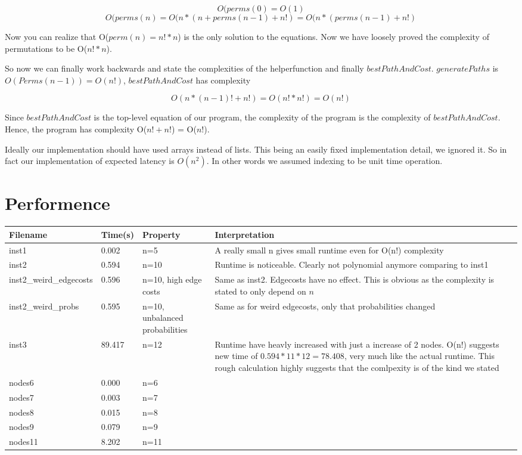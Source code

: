 \documentclass[a4paper,11pt]{article}
\begin{document}
$$ O(perms(0) = O(1) $$
$$ O(perms(n) = O(n*(n+perms(n-1)+n!) = O(n*(perms(n-1)+n!) $$

Now you can realize that O($perm(n) = n!*n$) is the only solution to
the equations. Now we have loosely proved the complexity of permutations
to be O($n!*n$).

So now we can finally work backwards and state the complexities of the helperfunction
and finally $bestPathAndCost$. $generatePaths$ is $O(Perms(n-1))=O(n!)$,
$bestPathAndCost$ has complexity

$$O(n*(n-1)! + n!) = O(n!*n!) = O(n!) $$

Since $bestPathAndCost$ is the top-level equation of our program,
the complexity of the program is the complexity of $bestPathAndCost$.
Hence, the program has complexity O($n!+n!$) = O($n!$).

Ideally our implementation should have used arrays instead of lists.
This being an easily fixed implementation detail, we ignored it.
So in fact our implementation of expected latency is $O(n^2)$.
In other words we assumed indexing to be unit time operation. 

\section{Performence}

\begin{center}
    \begin{tabular}{ | l | l | p{2.5cm} | p{6.5cm} |}
    \hline
    Filename & Time(s) & Property & Interpretation \\ \hline
    inst1 & 0.002 & n=5 & A really small n gives small runtime even for O(n!) complexity\\ \hline
    inst2 & 0.594 & n=10 & Runtime is noticeable. Clearly not polynomial anymore comparing to inst1 \\ \hline
    inst2\_weird\_edgecosts & 0.596 & n=10, high edge costs & Same as inst2. Edgecosts have no effect.
        This is obvious as the complexity is stated to only depend on $n$ \\ \hline
    inst2\_weird\_probs & 0.595 & n=10, unbalanced probabilities & Same as for weird edgecosts, only that probabilities changed \\ \hline
    inst3 & 89.417 & n=12 & Runtime have heavly increased with just a increase of 2 nodes.
        O(n!) suggests new time of $0.594*11*12=78.408$, very much like the actual runtime. 
        This rough calculation highly suggests that the comlpexity is of the kind we stated \\ \hline
    nodes6  & 0.000 & n=6  & \\ \hline
    nodes7  & 0.003 & n=7  & \\ \hline
    nodes8  & 0.015 & n=8  & \\ \hline
    nodes9  & 0.079 & n=9  & \\ \hline
    nodes11 & 8.202 & n=11 & \\ \hline
    \end{tabular}
\end{center}
\end{document}
